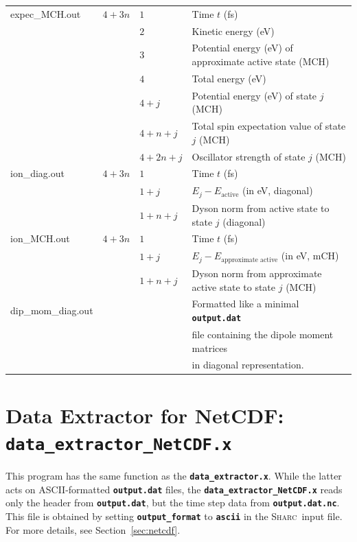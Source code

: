 \documentclass[a4paper,10pt,DIV=15,openany]{scrbook}
\newcommand{\sharc}{\textsc{Sharc}}
\newcommand{\ttt}[1]{\textbf{\texttt{#1}}}
\begin{document}
{\begin{longtable}{>{\ttfamily}lcll}
    expec\_MCH.out      &$4+3n$
      &$1$ &Time $t$ (fs)\\
      &&$2$ &Kinetic energy (eV)\\
      &&$3$ &Potential energy (eV) of approximate active state (MCH)\\
      &&$4$ &Total energy (eV)\\
      &&$4+j$ &Potential energy (eV) of state $j$ (MCH)\\
      &&$4+n+j$ &Total spin expectation value of state $j$ (MCH)\\
      &&$4+2n+j$ &Oscillator strength of state $j$ (MCH)\\
    \hline
    ion\_diag.out      &$4+3n$
      &$1$ &Time $t$ (fs)\\
      &&$1+j$ &$E_j-E_\text{active}$ (in eV, diagonal)\\
      &&$1+n+j$ &Dyson norm from active state to state $j$ (diagonal)\\
    \hline
    ion\_MCH.out      &$4+3n$
      &$1$ &Time $t$ (fs)\\
      &&$1+j$ &$E_j-E_\text{approximate active}$ (in eV, mCH)\\
      &&$1+n+j$ &Dyson norm from approximate active state to state $j$ (MCH)\\
    \hline
    dip\_mom\_diag.out
      &&&Formatted like a minimal \ttt{output.dat} \\
      &&&file containing the dipole moment matrices \\
      &&&in diagonal representation.\\
    \hline


\end{longtable}
}








\section{Data Extractor for NetCDF: \ttt{data\_extractor\_NetCDF.x}}\label{sec:data_extractor_NetCDF.x}

This program has the same function as the \ttt{data\_extractor.x}.
While the latter acts on ASCII-formatted \ttt{output.dat} files, the \ttt{data\_extractor\_NetCDF.x} reads only the header from \ttt{output.dat}, but the time step data from \ttt{output.dat.nc}.
This file is obtained by setting \ttt{output\_format} to \ttt{ascii} in the \sharc\ input file.
For more details, see Section~\ref{sec:netcdf}.
\end{document}
